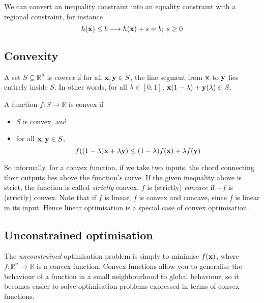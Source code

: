 We can convert an inequality constraint into an equality constraint with a regional constraint, for instance
\[
	h(\vb x) \leq b \longrightarrow h(\vb x) + s = b;\; s \geq 0
\]

\subsection{Convexity}
\begin{definition}
	A set \(S \subseteq \mathbb R^n\) is \textit{convex} if for all \(\vb x, \vb y \in S\), the line segment from \(\vb x\) to \(\vb y\) lies entirely inside \(S\).
	In other words, for all \(\lambda \in [0, 1]\), \(\vb x(1-\lambda) + \vb y(\lambda) \in S\).
\end{definition}

\begin{definition}
	A function \(f \colon S \to \mathbb R\) is convex if
	\begin{itemize}
		\item \(S\) is convex, and
		\item for all \(\vb x, \vb y \in S\),
		      \[
			      f\qty((1-\lambda)\vb x + \lambda \vb y) \leq (1-\lambda)f(\vb x) + \lambda f(\vb y)
		      \]
	\end{itemize}
\end{definition}
So informally, for a convex function, if we take two inputs, the chord connecting their outputs lies above the function's curve.
If the given inequality above is strict, the function is called \textit{strictly} convex.
\(f\) is (strictly) \textit{concave} if \(-f\) is (strictly) convex.
Note that if \(f\) is linear, \(f\) is convex and concave, since \(f\) is linear in its input.
Hence linear optimisation is a special case of convex optimisation.

\subsection{Unconstrained optimisation}
The \textit{unconstrained} optimisation problem is simply to minimise \(f(\vb x)\), where \(f \colon \mathbb R^n \to \mathbb R\) is a convex function.
Convex functions allow you to generalise the behaviour of a function in a small neighbourhood to global behaviour, so it becomes easier to solve optimisation problems expressed in terms of convex functions.

